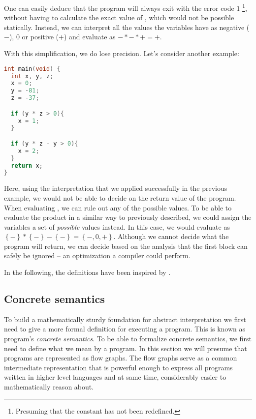 \documentclass[..thesis.tex]{subfiles}
\begin{document}
One can easily deduce that the program will always exit with the error code $1$ \footnote{Presuming that the constant  has not been redefined.},
without having to calculate the exact value of  , which would not be possible statically.
Instead, we can interpret all the values the variables have as negative ($-$), $0$ or positive ($+$) and evaluate   as $-*-*+ = +$.

With this simplification, we do lose precision. Let's consider another example:

\begin{lstlisting}[language=C,style=def]
int main(void) {
  int x, y, z;
  x = 0;
  y = -81;
  z = -37;

  if (y * z > 0){
    x = 1;
  }

  if (y * z - y > 0){
    x = 2;
  }
  return x;
}
\end{lstlisting}

Here, using the interpretation that we applied successfully in the previous example, we would not be able to decide on the return value of the program. 
When evaluating , we can rule out any of the possible values. To be able to evaluate the product in a similar way to previously described,
we could assign the variables a set of \textit{possible} values instead. In this case, we would evaluate  as $\left\lbrace - \right\rbrace * \left\lbrace
- \right\rbrace - \left\lbrace - \right\rbrace = \left\lbrace -,0,+ \right\rbrace$. Although we cannot decide what the program will return,
we can decide based on the analysis that the first  block can safely be ignored -- an optimization a compiler could perform.

In the following, the definitions have been inspired by \cite{vojdanivesal_static_2010, apinis_frameworks_2014}.

\subsection{Concrete semantics}

To build a mathematically sturdy foundation for abstract interpretation we first need to give a more formal definition for executing a program.
This is known as program's \emph{concrete semantics}.
To be able to formalize concrete semantics, we first need to define what we mean by a program. In this section we will presume that programs are represented as flow graphs.
The flow graphs serve as a common intermediate representation that is powerful enough to express all programs written in higher level languages and at same time,
considerably easier to mathematically reason about.
\end{document}
